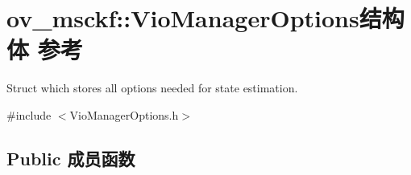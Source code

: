 \hypertarget{structov__msckf_1_1VioManagerOptions}{}\section{ov\+\_\+msckf\+:\+:Vio\+Manager\+Options结构体 参考}
\label{structov__msckf_1_1VioManagerOptions}


Struct which stores all options needed for state estimation.  




{\ttfamily \#include $<$Vio\+Manager\+Options.\+h$>$}

\subsection*{Public 成员函数}
